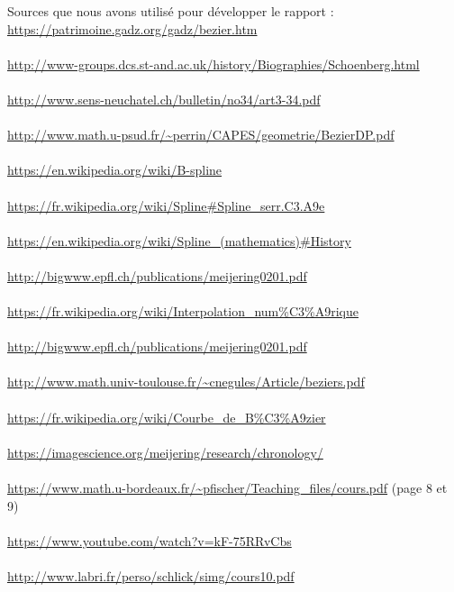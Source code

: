 \documentclass{article}
\begin{document}
Sources que nous avons utilis\'{e} pour d\'{e}velopper le rapport :
\\
{\color{blue}
\url{https://patrimoine.gadz.org/gadz/bezier.htm}}
\\\\
{\color{blue}
\url{http://www-groups.dcs.st-and.ac.uk/history/Biographies/Schoenberg.html}}
\\\\
{\color{blue}
\url{http://www.sens-neuchatel.ch/bulletin/no34/art3-34.pdf}}
\\\\
{\color{blue}
\url{http://www.math.u-psud.fr/~perrin/CAPES/geometrie/BezierDP.pdf}}
\\\\
{\color{blue}
\url{https://en.wikipedia.org/wiki/B-spline}}
\\\\
{\color{blue}
\url{https://fr.wikipedia.org/wiki/Spline#Spline_serr.C3.A9e}}
\\\\
{\color{blue}
\url{https://en.wikipedia.org/wiki/Spline_(mathematics)#History}}
\\\\
{\color{blue}
\url{http://bigwww.epfl.ch/publications/meijering0201.pdf}}
\\\\
{\color{blue}
\url{https://fr.wikipedia.org/wiki/Interpolation_num%C3%A9rique}}
\\\\
{\color{blue}
\url{http://bigwww.epfl.ch/publications/meijering0201.pdf}}
\\\\
{\color{blue}
\url{http://www.math.univ-toulouse.fr/~cnegules/Article/beziers.pdf}}
\\\\
{\color{blue}
\url{https://fr.wikipedia.org/wiki/Courbe_de_B%C3%A9zier}}
\\\\
{\color{blue}
\url{https://imagescience.org/meijering/research/chronology/}}
\\\\
{\color{blue}
\url{https://www.math.u-bordeaux.fr/~pfischer/Teaching_files/cours.pdf}} (page 8 et 9)
\\\\
{\color{blue}
\url{https://www.youtube.com/watch?v=kF-75RRvCbs}} 
\\\\
{\color{blue}
\url{http://www.labri.fr/perso/schlick/simg/cours10.pdf}}
\end{document}
